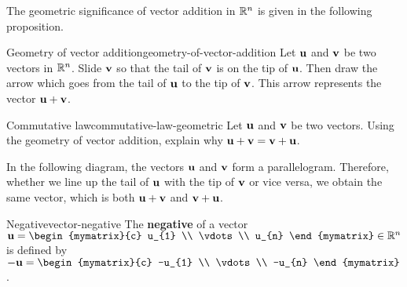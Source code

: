 The geometric significance of vector addition in $\mathbb{R}^n$ is given in
the following proposition.

\begin{proposition}{Geometry of vector addition}{geometry-of-vector-addition}
  Let $\vect{u}$ and $\vect{v}$ be two vectors in $\mathbb{R}^n$. Slide
  $\vect{v}$ so that the tail of $\vect{v}$ is on the tip of
  $\vect{u}$. Then draw the arrow which goes from the tail of
  $\vect{u}$ to the tip of $\vect{v}$.  This arrow represents the
  vector $\vect{u}+\vect{v}$.

  \begin{center}
  \end{center}
\end{proposition}

\begin{example}{Commutative law}{commutative-law-geometric}
  Let $\vect{u}$ and $\vect{v}$ be two vectors. Using the geometry of
  vector addition, explain why $\vect{u}+\vect{v} = \vect{v} + \vect{u}$.
\end{example}

\begin{solution}
  In the following diagram, the vectors $\vect{u}$ and $\vect{v}$ form
  a parallelogram. Therefore, whether we line up the tail of
  $\vect{u}$ with the tip of $\vect{v}$ or vice versa, we obtain the
  same vector, which is both $\vect{u}+\vect{v}$ and
  $\vect{v}+\vect{u}$.
\begin{center}
\end{center}
\end{solution}

\begin{definition}{Negative}{vector-negative}
  The \textbf{negative}%
   of a vector
  $\vect{u}=\begin{mymatrix}{c}
    u_{1} \\
    \vdots \\
    u_{n}
  \end{mymatrix}\in\R^n$ is defined by
  $-\vect{u} = \begin{mymatrix}{c}
    -u_{1} \\
    \vdots \\
    -u_{n}
  \end{mymatrix}$.
\end{definition}

